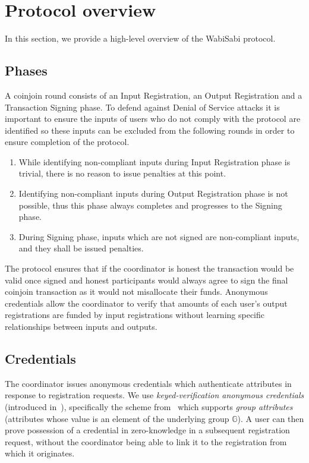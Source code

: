 \documentclass[a4paper]{article}
\begin{document}
\section{Protocol overview} \label{sec:overview}
In this section, we provide a high-level overview of the WabiSabi protocol.
\subsection{Phases}

A coinjoin round consists of an Input Registration, an Output Registration and a Transaction Signing phase. To defend against Denial of Service attacks it is important to ensure the inputs of users who do not comply with the protocol are identified so these inputs can be excluded from the following rounds in order to ensure completion of the protocol.

\begin{enumerate}
    \item While identifying non-compliant inputs during Input Registration phase is trivial, there is no reason to issue penalties at this point.
    \item Identifying non-compliant inputs during Output Registration phase is not possible, thus this phase always completes and progresses to the Signing phase.
    \item During Signing phase, inputs which are not signed are non-compliant inputs, and they shall be issued penalties.
\end{enumerate}

The protocol ensures that if the coordinator is honest the transaction would be valid once signed and honest participants would always agree to sign the final coinjoin transaction as it would not misallocate their funds. Anonymous credentials allow the coordinator to verify that amounts of each user's output registrations are funded by input registrations without learning specific relationships between inputs and outputs.

\subsection{Credentials}

The coordinator issues anonymous credentials \cite{brands1993untraceable,brands2000rethinking,baldimtsi2013anonymous} which authenticate attributes in response to registration requests. We use \emph{keyed-verification anonymous credentials} (introduced in~\cite{chase2014algebraic}), specifically the scheme from~\cite{chase2019signal} which supports \emph{group attributes} (attributes whose value is an element of the underlying group $\mathbb{G}$). A user can then prove possession of a credential in zero-knowledge in a subsequent registration request, without the coordinator being able to link it to the registration from which it originates.
\end{document}
